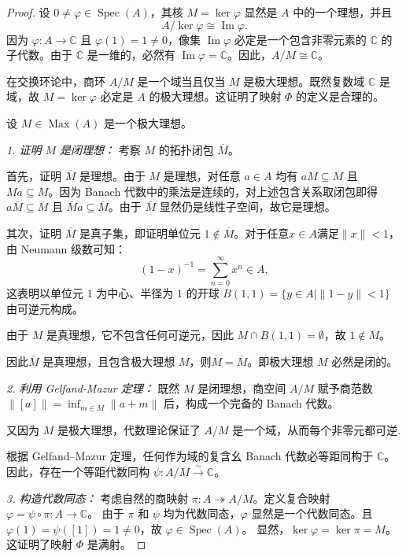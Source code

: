 \documentclass{ctexart}
\theoremstyle{plain}
\newtheorem*{proof}{证明}
\theoremstyle{plain}
\DeclareMathOperator{\Spec}{Spec}
\begin{document}
\begin{proof}
     设 $0\neq \varphi \in \Spec(A)$，其核 $M = \ker\varphi$ 显然是 $A$ 中的一个理想，并且
    \begin{equation*}
        A / \ker\varphi \cong \operatorname{Im}\varphi.
    \end{equation*}
    因为 $\varphi: A \to \mathbb{C}$ 且 $\varphi(1) = 1 \neq 0$，像集 $\operatorname{Im}\varphi$ 必定是一个包含非零元素的 $\mathbb{C}$ 的子代数。由于 $\mathbb{C}$ 是一维的，必然有 $\operatorname{Im}\varphi = \mathbb{C}$。因此，$A / M \cong \mathbb{C}$。\par
    在交换环论中，商环 $A/M$ 是一个域当且仅当 $M$ 是极大理想。既然复数域 $\mathbb{C}$ 是域，故 $M = \ker\varphi$ 必定是 $A$ 的极大理想。这证明了映射 $\Phi$ 的定义是合理的。

     设 $M \in \operatorname{Max}(A)$ 是一个极大理想。\par
    \textit{1. 证明 $M$ 是闭理想：} 
    考察 $M$ 的拓扑闭包 $\overline{M}$。
    
    首先，证明 $\overline{M}$ 是理想。由于 $M$ 是理想，对任意 $a \in A$ 均有 $aM \subseteq M$ 且 $Ma \subseteq M$。因为 Banach 代数中的乘法是连续的，对上述包含关系取闭包即得 $a\overline{M} \subseteq \overline{M}$ 且 $\overline{M}a \subseteq \overline{M}$。由于 $\overline{M}$ 显然仍是线性子空间，故它是理想。
    
    其次，证明 $\overline{M}$ 是真子集，即证明单位元 $1 \notin \overline{M}$。对于任意$x \in A$满足$\|x\| < 1$，由 Neumann 级数可知：
    \begin{equation*}
        (1 - x)^{-1} = \sum_{n=0}^{\infty} x^n \in A,
    \end{equation*}
    这表明以单位元 $1$ 为中心、半径为 $1$ 的开球 $B(1, 1) = \{ y \in A \mid \|1 - y\| < 1 \}$ 由可逆元构成。\par
    由于 $M$ 是真理想，它不包含任何可逆元，因此 $M \cap B(1, 1) = \emptyset$，故 $1\notin \overline{M}$。
    
    因此$\overline{M}$ 是真理想，且包含极大理想 $M$，则$M = \overline{M}$。即极大理想 $M$ 必然是闭的。\par
    \textit{2. 利用 Gelfand-Mazur 定理：}
    既然 $M$ 是闭理想，商空间 $A/M$ 赋予商范数 $\| [a] \| = \inf_{m \in M} \|a+m\|$ 后，构成一个完备的 Banach 代数。 \par
    又因为 $M$ 是极大理想，代数理论保证了 $A/M$ 是一个域，从而每个非零元都可逆.\par
    根据 Gelfand--Mazur 定理，任何作为域的复含幺 Banach 代数必等距同构于 $\mathbb{C}$。因此，存在一个等距代数同构 $\psi: A/M \xrightarrow{\sim} \mathbb{C}$。\par
    \textit{3. 构造代数同态：}
    考虑自然的商映射 $\pi: A \twoheadrightarrow A/M$。定义复合映射 $\varphi = \psi \circ \pi: A \to \mathbb{C}$。
    由于 $\pi$ 和 $\psi$ 均为代数同态，$\varphi$ 显然是一个代数同态。且 $\varphi(1) = \psi([1]) = 1 \neq 0$，故 $\varphi \in \Spec(A)$。
    显然，$\ker\varphi = \ker\pi = M$。这证明了映射 $\Phi$ 是满射。


\end{proof}
\end{document}
